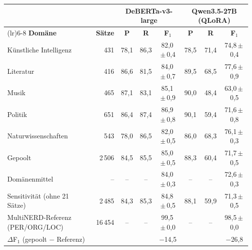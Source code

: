 \begin{tabular}{>{\raggedright\arraybackslash}p{4.6cm}rcccccc}
    \toprule
    & & \multicolumn{3}{c}{\textbf{DeBERTa-v3-large}} &
      \multicolumn{3}{c}{\textbf{Qwen3.5-27B (QLoRA)}} \\
    \cmidrule(lr){3-5}\cmidrule(lr){6-8}
    \textbf{Dom\"ane} & \textbf{S\"atze} & \textbf{P} & \textbf{R} & \textbf{F$_1$} &
      \textbf{P} & \textbf{R} & \textbf{F$_1$} \\
    \midrule
    K\"unstliche Intelligenz & 431 & 78,1 & 86,3 & 82,0\,$\pm$\,0,4 & 78,5 & 71,4 & 74,8\,$\pm$\,0,4 \\
    Literatur & 416 & 86,6 & 81,5 & 84,0\,$\pm$\,0,7 & 89,5 & 68,5 & 77,6\,$\pm$\,0,9 \\
    Musik & 465 & 87,1 & 83,1 & 85,1\,$\pm$\,0,9 & 90,0 & 48,4 & 63,0\,$\pm$\,0,5 \\
    Politik & 651 & 86,4 & 87,4 & 86,9\,$\pm$\,0,8 & 90,1 & 59,4 & 71,6\,$\pm$\,0,8 \\
    Naturwissenschaften & 543 & 78,0 & 86,5 & 82,0\,$\pm$\,0,5 & 86,0 & 68,3 & 76,1\,$\pm$\,0,3 \\
    \midrule
    Gepoolt & 2\,506 & 84,5 & 85,5 & 85,0\,$\pm$\,0,5 & 88,3 & 60,4 & 71,7\,$\pm$\,0,5 \\
    Dom\"anenmittel & -- & -- & -- & 84,0\,$\pm$\,0,3 & -- & -- & 72,6\,$\pm$\,0,3 \\
    Sensitivit\"at (ohne 21 S\"atze) & 2\,485 & 84,3 & 85,3 & 84,8\,$\pm$\,0,5 & 88,1 & 59,9 & 71,3\,$\pm$\,0,5 \\
    \midrule
    MultiNERD-Referenz (PER/ORG/LOC) & 16\,454 & -- & -- & 99,5\,$\pm$\,0,0 & -- & -- & 98,5\,$\pm$\,0,0 \\
    $\Delta$F$_1$ (gepoolt $-$ Referenz) & & & & $-$14,5 & & & $-$26,8 \\
    \bottomrule
\end{tabular}

